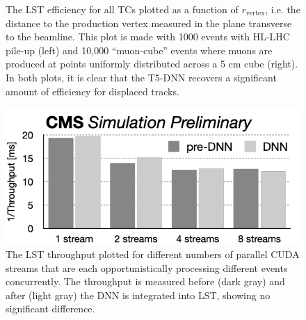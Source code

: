 \begin{figure}[!htb]
    \centering
    \qquad
    \caption[LST efficiency for all TCs plotted as a function of $r_\text{vertex}$]{
        The LST efficiency for all TCs plotted as a function of $r_\text{vertex}$, i.e. the distance to the production vertex measured in the plane transverse to the beamline.
        This plot is made with 1000 \ttbar events with HL-LHC pile-up (left) and 10,000 ``muon-cube'' events where muons are produced at points uniformly distributed across a 5 cm cube (right).
        In both plots, it is clear that the T5-DNN recovers a significant amount of efficiency for displaced tracks.
    }
    \label{fig:t5dnn_dis}
\end{figure}

\begin{figure}[!htb]
    \centering
    \includegraphics[width=0.75\linewidth]{fig/lst/throughput_vs_streams.pdf}
    \caption[LST throughput plotted for different numbers of parallel CUDA streams]{
        The LST throughput plotted for different numbers of parallel CUDA streams that are each opportunistically processing different events concurrently. 
        The throughput is measured before (dark gray) and after (light gray) the DNN is integrated into LST, showing no significant difference.
    }
    \label{fig:streams-vs-throughput}
\end{figure}

